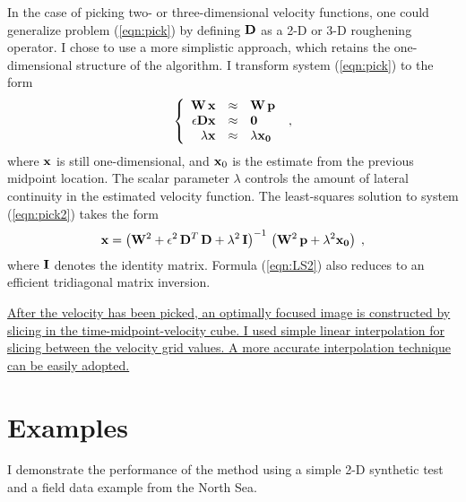 
\par
In the case of picking two- or three-dimensional velocity functions,
one could generalize problem (\ref{eqn:pick}) by defining $\bold{D}$
as a 2-D or 3-D roughening operator. I chose to use a more simplistic
approach, which retains the one-dimensional structure of the algorithm. 
I transform system (\ref{eqn:pick}) to the form
\begin{equation}
  \label{eqn:pick2}
  \left\{\begin{array}{rcl}
      \bold{W}\,\bold{x} & \approx & \bold{W}\,\bold{p} \\
      \epsilon \bold{D} \bold{x} & \approx & \bold{0} \\
      \lambda \bold{x} & \approx & \lambda \bold{x_0}
    \end{array}\right.\;,
\end{equation}
where $\bold{x}$ is still one-dimensional, and $\bold{x}_0$ is the
estimate from the previous midpoint location. The scalar parameter
$\lambda$ controls the amount of lateral continuity in the estimated
velocity function. The least-squares solution to system
(\ref{eqn:pick2}) takes the form
\begin{equation}
  \label{eqn:LS2}
  \bold{x} = 
  \left(\bold{W}^2 + \epsilon^2\,\bold{D}^T\,\bold{D}
    + \lambda^2\,\bold{I}\right)^{-1}\,
  \left(\bold{W}^2\,\bold{p} + \lambda^2 \bold{x_0}\right)\;,
\end{equation}
where $\bold{I}$ denotes the identity matrix. Formula (\ref{eqn:LS2})
also reduces to an efficient tridiagonal matrix inversion.

\uline{After the velocity has been picked, an optimally focused image is constructed
by slicing in the time-midpoint-velocity cube. I used simple linear
interpolation for slicing between the velocity grid values. A more accurate
interpolation technique can be easily adopted.}

\section{Examples}

I demonstrate the performance of the method using a simple 2-D synthetic
test and a field data example from the North Sea.

